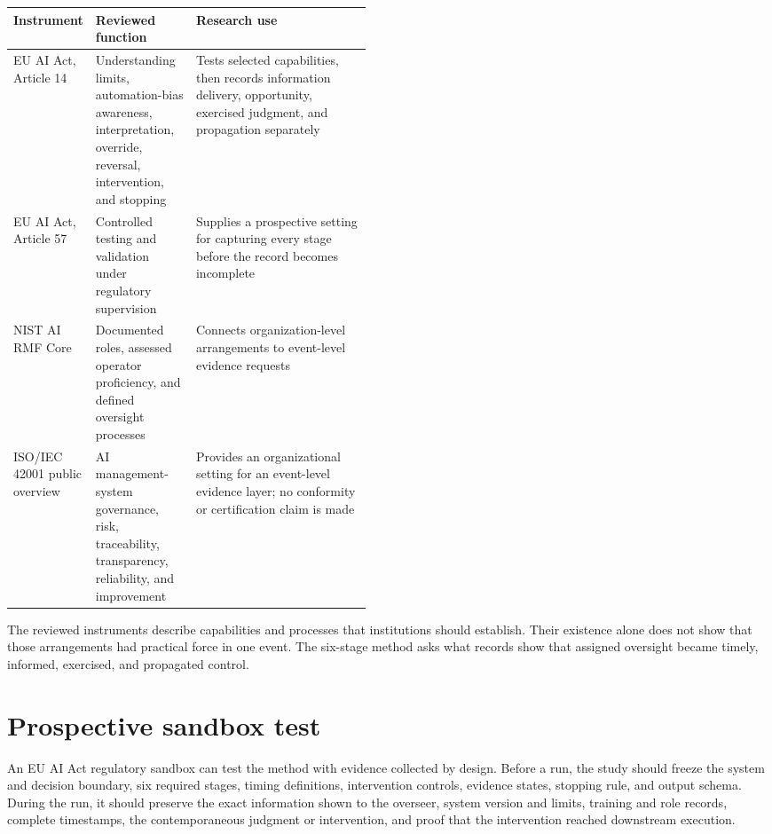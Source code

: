 \documentclass[11pt]{article}
\begin{document}
\small
\begin{tabularx}{\linewidth}{@{}>{\raggedright\arraybackslash}p{0.19\linewidth}>{\raggedright\arraybackslash}p{0.28\linewidth}>{\raggedright\arraybackslash}X@{}}
\toprule
\rowcolor{TAEPaleNavy}
\textcolor{TAENavy}{\textbf{Instrument}} & \textcolor{TAENavy}{\textbf{Reviewed function}} & \textcolor{TAENavy}{\textbf{Research use}} \\
\midrule
EU AI Act, Article 14 & Understanding limits, automation-bias awareness, interpretation, override, reversal, intervention, and stopping & Tests selected capabilities, then records information delivery, opportunity, exercised judgment, and propagation separately \\
EU AI Act, Article 57 & Controlled testing and validation under regulatory supervision & Supplies a prospective setting for capturing every stage before the record becomes incomplete \\
NIST AI RMF Core & Documented roles, assessed operator proficiency, and defined oversight processes & Connects organization-level arrangements to event-level evidence requests \\
ISO/IEC 42001 public overview & AI management-system governance, risk, traceability, transparency, reliability, and improvement & Provides an organizational setting for an event-level evidence layer; no conformity or certification claim is made \\
\bottomrule
\end{tabularx}
\normalsize

The reviewed instruments describe capabilities and processes that institutions should establish. Their existence alone does not show that those arrangements had practical force in one event. The six-stage method asks what records show that assigned oversight became timely, informed, exercised, and propagated control.

\section*{Prospective sandbox test}

An EU AI Act regulatory sandbox can test the method with evidence collected by design. Before a run, the study should freeze the system and decision boundary, six required stages, timing definitions, intervention controls, evidence states, stopping rule, and output schema. During the run, it should preserve the exact information shown to the overseer, system version and limits, training and role records, complete timestamps, the contemporaneous judgment or intervention, and proof that the intervention reached downstream execution.
\end{document}
